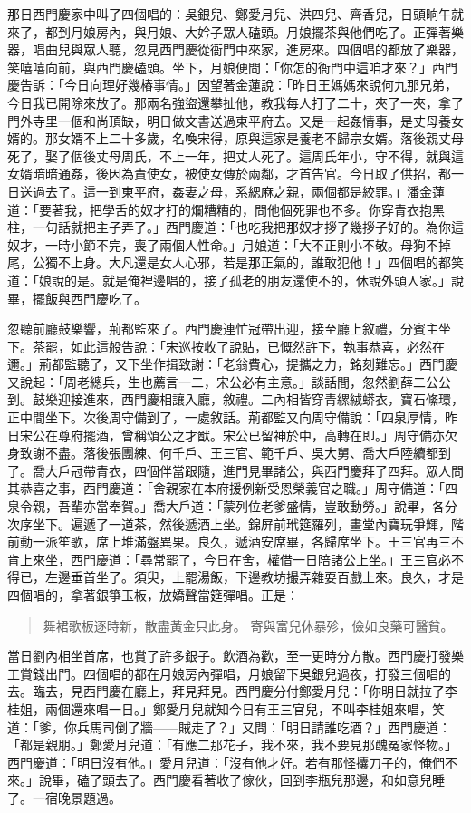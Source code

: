 那日西門慶家中叫了四個唱的：吳銀兒、鄭愛月兒、洪四兒、齊香兒，日頭晌午就來了，都到月娘房內，與月娘、大妗子眾人磕頭。月娘擺茶與他們吃了。正彈著樂器，唱曲兒與眾人聽，忽見西門慶從衙門中來家，進房來。四個唱的都放了樂器，笑嘻嘻向前，與西門慶磕頭。坐下，月娘便問：「你怎的衙門中這咱才來？」西門慶告訴：「今日向理好幾樁事情。」因望著金蓮說：「昨日王媽媽來說何九那兄弟，今日我已開除來放了。那兩名強盜還攀扯他，教我每人打了二十，夾了一夾，拿了門外寺里一個和尚頂缺，明日做文書送過東平府去。又是一起姦情事，是丈母養女婿的。那女婿不上二十多歲，名喚宋得，原與這家是養老不歸宗女婿。落後親丈母死了，娶了個後丈母周氏，不上一年，把丈人死了。這周氏年小，守不得，就與這女婿暗暗通姦，後因為責使女，被使女傳於兩鄰，才首告官。今日取了供招，都一日送過去了。這一到東平府，姦妻之母，系緦麻之親，兩個都是絞罪。」潘金蓮道：「要著我，把學舌的奴才打的爛糟糟的，問他個死罪也不多。你穿青衣抱黑柱，一句話就把主子弄了。」西門慶道：「也吃我把那奴才拶了幾拶子好的。為你這奴才，一時小節不完，喪了兩個人性命。」月娘道：「大不正則小不敬。母狗不掉尾，公獨不上身。大凡還是女人心邪，若是那正氣的，誰敢犯他！」四個唱的都笑道：「娘說的是。就是俺裡邊唱的，接了孤老的朋友還使不的，休說外頭人家。」說畢，擺飯與西門慶吃了。

忽聽前廳鼓樂響，荊都監來了。西門慶連忙冠帶出迎，接至廳上敘禮，分賓主坐下。茶罷，如此這般告說：「宋巡按收了說貼，已慨然許下，執事恭喜，必然在邇。」荊都監聽了，又下坐作揖致謝：「老翁費心，提攜之力，銘刻難忘。」西門慶又說起：「周老總兵，生也薦言一二，宋公必有主意。」談話間，忽然劉薛二公公到。鼓樂迎接進來，西門慶相讓入廳，敘禮。二內相皆穿青縲絨蟒衣，寶石絛環，正中間坐下。次後周守備到了，一處敘話。荊都監又向周守備說：「四泉厚情，昨日宋公在尊府擺酒，曾稱頌公之才猷。宋公已留神於中，高轉在即。」周守備亦欠身致謝不盡。落後張團練、何千戶、王三官、範千戶、吳大舅、喬大戶陸續都到了。喬大戶冠帶青衣，四個伴當跟隨，進門見畢諸公，與西門慶拜了四拜。眾人問其恭喜之事，西門慶道：「舍親家在本府援例新受恩榮義官之職。」周守備道：「四泉令親，吾輩亦當奉賀。」喬大戶道：「蒙列位老爹盛情，豈敢動勞。」說畢，各分次序坐下。遍遞了一道茶，然後遞酒上坐。錦屏前玳筵羅列，畫堂內寶玩爭輝，階前動一派笙歌，席上堆滿盤異果。良久，遞酒安席畢，各歸席坐下。王三官再三不肯上來坐，西門慶道：「尋常罷了，今日在舍，權借一日陪諸公上坐。」王三官必不得已，左邊垂首坐了。須臾，上罷湯飯，下邊教坊撮弄雜耍百戲上來。良久，才是四個唱的，拿著銀箏玉板，放嬌聲當筵彈唱。正是：
\begin{quote}
舞裙歌板逐時新，散盡黃金只此身。
寄與富兒休暴殄，儉如良藥可醫貧。
\end{quote}

當日劉內相坐首席，也賞了許多銀子。飲酒為歡，至一更時分方散。西門慶打發樂工賞錢出門。四個唱的都在月娘房內彈唱，月娘留下吳銀兒過夜，打發三個唱的去。臨去，見西門慶在廳上，拜見拜見。西門慶分付鄭愛月兒：「你明日就拉了李桂姐，兩個還來唱一日。」鄭愛月兒就知今日有王三官兒，不叫李桂姐來唱，笑道：「爹，你兵馬司倒了牆——賊走了？」又問：「明日請誰吃酒？」西門慶道：「都是親朋。」鄭愛月兒道：「有應二那花子，我不來，我不要見那醜冤家怪物。」西門慶道：「明日沒有他。」愛月兒道：「沒有他才好。若有那怪攮刀子的，俺們不來。」說畢，磕了頭去了。西門慶看著收了傢伙，回到李瓶兒那邊，和如意兒睡了。一宿晚景題過。

